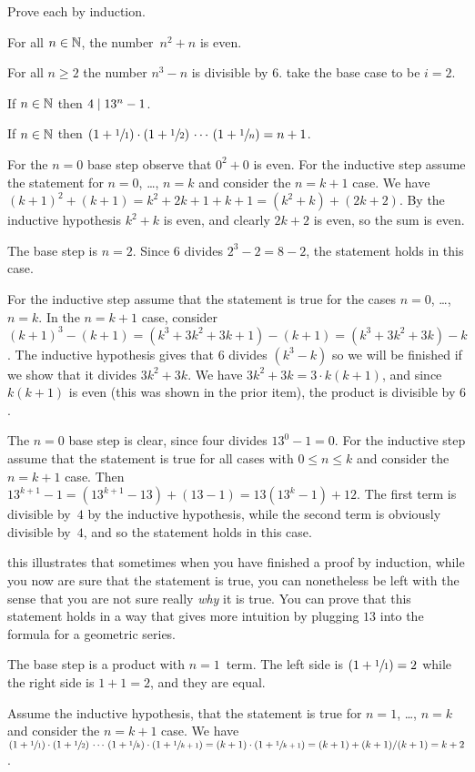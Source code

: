 \documentclass{ibl}  %
\begin{document}
\begin{ex}
Prove each by induction.
\begin{exes}
\item For all $n\in\mathbb{N}$, the number~$n^2+n$ is even.
\item For all $n\geq 2$ the number $n^3-n$ is divisible by $6$.
  \hint take the base case to be $i=2$.
\item If $n\in\mathbb{N}$ then $4\mid 13^n-1$.
\item If $n\in\mathbb{N}$ then
    $(1+\sfrac{1}{1})\cdot(1+\sfrac{1}{2})\,\cdots\,(1+\sfrac{1}{n})=n+1$.
\end{exes}
\begin{ans}
\begin{exes}
\item For the $n=0$ base step observe that $0^2+0$ is even.
  For the inductive step assume the statement for $n=0$, \ldots, $n=k$
  and consider the $n=k+1$ case.
  We have $(k+1)^2+(k+1)=k^2+2k+1+k+1=(k^2+k)+(2k+2)$. 
  By the inductive hypothesis $k^2+k$ is even, and clearly $2k+2$ is even, 
  so the sum is even.
\item The base step is $n=2$.
  Since $6$ divides $2^3-2=8-2$, the statement holds in this case.

  For the inductive step assume that the statement is true for 
  the cases $n=0$, \ldots, $n=k$.
  In the $n=k+1$ case, consider 
  $(k+1)^3-(k+1)=(k^3+3k^2+3k+1)-(k+1)=(k^3+3k^2+3k)-k$.
  The inductive hypothesis gives that $6$ divides $(k^3-k)$ so we will
  be finished if we show that it divides  $3k^2+3k$.
  We have $3k^2+3k=3\cdot k(k+1)$, and since
  $k(k+1)$ is even (this was shown in the prior item),
  the product is divisible by $6$.  
\item The $n=0$ base step is clear, since four divides $13^0-1=0$.
  For the inductive step assume that the statement is true for all cases 
  with $0\leq n\leq k$ and consider the $n=k+1$ case.
  Then $13^{k+1}-1=(13^{k+1}-13)+(13-1)=13(13^k-1)+12$.
  The first term is divisible by~$4$ by the inductive hypothesis, while the
  second term is obviously divisible by~$4$, and so the statement holds in 
  this case.

  \remark
  this illustrates that 
  sometimes when you have finished a proof by induction, 
  while you now are sure that the statement is true, 
  you can nonetheless be left with the sense
  that you are not sure really \emph{why} it is true.
  You can prove that this statement holds in a 
  way that gives more intuition by plugging $13$ into the formula for a
  geometric series. 
\item The base step is a product with $n=1$~term.
  The left side is $(1+\sfrac{1}{1})=2$ while the right side is $1+1=2$,
  and they are equal.

  Assume the inductive hypothesis, that the statement is true for
  $n=1$, \ldots, $n=k$ and consider the $n=k+1$ case.
  We have
  $(1+\sfrac{1}{1})\cdot(1+\sfrac{1}{2})\,\cdots\,(1+\sfrac{1}{k})\cdot(1+\sfrac{1}{k+1})
  =
  (k+1)\cdot(1+\sfrac{1}{k+1})
  =(k+1)+(k+1)/(k+1)
  =k+2$.
\end{exes}
\end{ans}
\end{ex}
\end{document}
